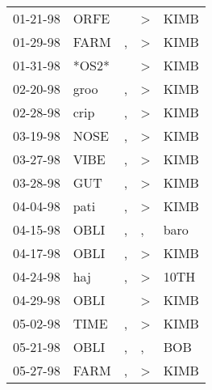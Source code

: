\begin{supertabular}{p{0.07\textwidth}p{0.06\textwidth}p{0.02\textwidth}p{0.02\textwidth}p{0.06\textwidth}}
 01-21-98\textsuperscript{} &  ORFE\textsuperscript{} &               &  \textgreater &  KIMB\textsuperscript{} \\
 01-29-98\textsuperscript{} &  FARM\textsuperscript{} &             , &  \textgreater &  KIMB\textsuperscript{} \\
 01-31-98\textsuperscript{} &                   *OS2* &               &  \textgreater &  KIMB\textsuperscript{} \\
 02-20-98\textsuperscript{} &  groo\textsuperscript{} &             , &  \textgreater &  KIMB\textsuperscript{} \\
 02-28-98\textsuperscript{} &  crip\textsuperscript{} &             , &  \textgreater &  KIMB\textsuperscript{} \\
 03-19-98\textsuperscript{} &  NOSE\textsuperscript{} &             , &  \textgreater &  KIMB\textsuperscript{} \\
 03-27-98\textsuperscript{} &  VIBE\textsuperscript{} &             , &  \textgreater &  KIMB\textsuperscript{} \\
 03-28-98\textsuperscript{} &   GUT\textsuperscript{} &             , &  \textgreater &  KIMB\textsuperscript{} \\
 04-04-98\textsuperscript{} &  pati\textsuperscript{} &             , &  \textgreater &  KIMB\textsuperscript{} \\
 04-15-98\textsuperscript{} &  OBLI\textsuperscript{} &             , &             , &  baro\textsuperscript{} \\
 04-17-98\textsuperscript{} &  OBLI\textsuperscript{} &             , &  \textgreater &  KIMB\textsuperscript{} \\
 04-24-98\textsuperscript{} &   haj\textsuperscript{} &             , &  \textgreater &  10TH\textsuperscript{} \\
 04-29-98\textsuperscript{} &  OBLI\textsuperscript{} &               &  \textgreater &  KIMB\textsuperscript{} \\
 05-02-98\textsuperscript{} &  TIME\textsuperscript{} &             , &  \textgreater &  KIMB\textsuperscript{} \\
 05-21-98\textsuperscript{} &  OBLI\textsuperscript{} &             , &             , &   BOB\textsuperscript{} \\
 05-27-98\textsuperscript{} &  FARM\textsuperscript{} &             , &  \textgreater &  KIMB\textsuperscript{} \\

\end{supertabular}
